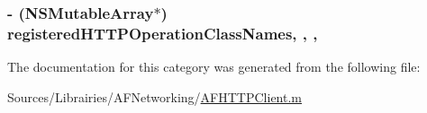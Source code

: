 \hypertarget{category_a_f_h_t_t_p_client_07_08_afa70d79a30e43329c545f47f508e6bf6}{
\subsubsection[{registered\-H\-T\-T\-P\-Operation\-Class\-Names}]{\setlength{\rightskip}{0pt plus 5cm}-\/ (N\-S\-Mutable\-Array$\ast$) registered\-H\-T\-T\-P\-Operation\-Class\-Names\hspace{0.3cm}{\ttfamily [read]}, {\ttfamily [write]}, {\ttfamily [nonatomic]}, {\ttfamily [strong]}}}\label{category_a_f_h_t_t_p_client_07_08_afa70d79a30e43329c545f47f508e6bf6}


The documentation for this category was generated from the following file\-:\begin{DoxyCompactItemize}
\item 
Sources/\-Librairies/\-A\-F\-Networking/\hyperlink{_a_f_h_t_t_p_client_8m}{A\-F\-H\-T\-T\-P\-Client.\-m}\end{DoxyCompactItemize}
